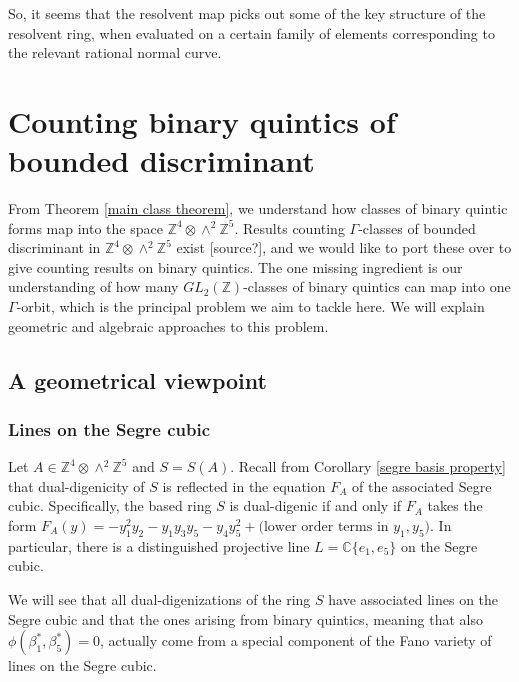 \documentclass{report}
\begin{document}
So, it seems that the resolvent map picks out some of the key structure of the resolvent ring, when evaluated on a certain family of elements corresponding to the relevant rational normal curve.










\chapter{Counting binary quintics of bounded discriminant}

From Theorem \ref{main class theorem}, we understand how classes of binary quintic forms map into the space $\mathbb{Z}^4 \otimes \wedge^2 \mathbb{Z}^5$.  Results counting $\Gamma$-classes of bounded discriminant in $\mathbb{Z}^4 \otimes \wedge^2 \mathbb{Z}^5$ exist [source?], and we would like to port these over to give counting results on binary quintics.  The one missing ingredient is our understanding of how many $GL_2(\mathbb{Z})$-classes of binary quintics can map into one $\Gamma$-orbit, which is the principal problem we aim to tackle here.  We will explain geometric and algebraic approaches to this problem.

\section{A geometrical viewpoint}

\subsection{Lines on the Segre cubic}

Let $A \in \mathbb{Z}^4 \otimes \wedge^2 \mathbb{Z}^5$ and $S = S(A)$.  Recall from Corollary \ref{segre basis property} that dual-digenicity of $S$ is reflected in the equation $F_A$ of the associated Segre cubic.  Specifically, the based ring $S$ is dual-digenic if and only if $F_A$ takes the form $F_A(y) = - y_1^2 y_2 - y_1 y_3 y_5 - y_4 y_5^2 + \text{(lower order terms in $y_1, y_5$)}$.  In particular, there is a distinguished projective line $L = \mathbb{C} \{e_1,e_5\}$ on the Segre cubic.

We will see that all dual-digenizations of the ring $S$ have associated lines on the Segre cubic and that the ones arising from binary quintics, meaning that also $\phi (\beta_1^*, \beta_5^*) = 0$, actually come from a special component of the Fano variety of lines on the Segre cubic.
\end{document}
